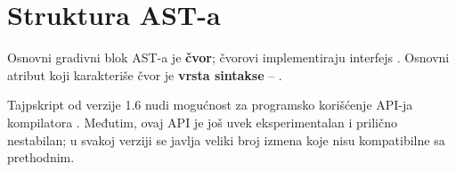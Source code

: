 \section{Struktura AST-a}

Osnovni gradivni blok AST-a je \textbf{čvor}; čvorovi implementiraju interfejs .
Osnovni atribut koji karakteriše čvor je \textbf{vrsta sintakse} -- .

Tajpskript od verzije 1.6 nudi mogućnost za programsko korišćenje API-ja kompilatora \cite{gh:ms:ts:wiki:using-the-compiler-api}.
Međutim, ovaj API je još uvek eksperimentalan i prilično nestabilan; u svakoj verziji se javlja veliki broj izmena koje nisu kompatibilne sa prethodnim.
